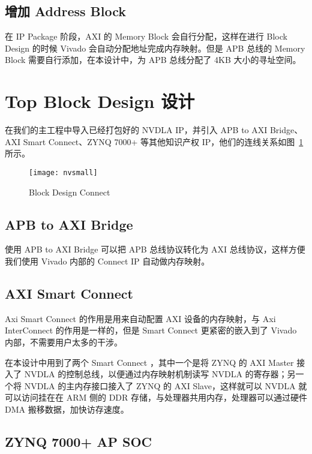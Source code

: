 \subsection{增加 Address Block}

在 IP Package 阶段，AXI 的 Memory Block 会自行分配，这样在进行 Block Design 的时候 Vivado 会自动分配地址完成内存映射。但是 APB 总线的 Memory Block 需要自行添加，在本设计中，为 APB 总线分配了 4KB 大小的寻址空间。

\section{Top Block Design 设计}

在我们的主工程中导入已经打包好的 NVDLA IP，并引入 APB to AXI Bridge、AXI Smart Connect、ZYNQ 7000+ 等其他知识产权 IP，他们的连线关系如图~\ref{fig:Block Design Connect}所示。

\begin{figure}[!htbp]
    \centering
    \texttt{[image: nvsmall]}
    \caption{Block Design Connect}
    \label{fig:Block Design Connect}
\end{figure}

\subsection{APB to AXI Bridge}

使用 APB to AXI Bridge 可以把 APB 总线协议转化为 AXI 总线协议，这样方便我们使用 Vivado 内部的 Connect IP 自动做内存映射。

\subsection{AXI Smart Connect}

Axi Smart Connect 的作用是用来自动配置 AXI 设备的内存映射，与 Axi InterConnect 的作用是一样的，但是 Smart Connect 更紧密的嵌入到了 Vivado 内部，不需要用户太多的干涉。

在本设计中用到了两个 Smart Connect ，其中一个是将 ZYNQ 的 AXI Master 接入了 NVDLA 的控制总线，以便通过内存映射机制读写 NVDLA 的寄存器；另一个将 NVDLA 的主内存接口接入了 ZYNQ 的 AXI Slave，这样就可以 NVDLA 就可以访问挂在在 ARM 侧的 DDR 存储，与处理器共用内存，处理器可以通过硬件 DMA 搬移数据，加快访存速度。

\subsection{ZYNQ 7000+ AP SOC}

